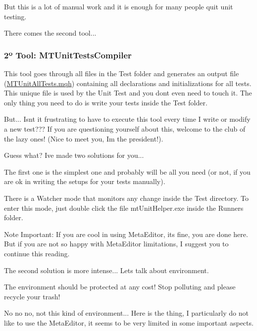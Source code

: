 But this is a lot of manual work and it is enough for many people quit unit testing.

There comes the second tool...

\subsubsection*{2º Tool\+: M\+T\+Unit\+Tests\+Compiler}

This tool goes through all files in the Test folder and generates an output file (\mbox{\hyperlink{_m_t_unit_all_tests_8mqh}{M\+T\+Unit\+All\+Tests.\+mqh}}) containing all declarations and initializations for all tests. This unique file is used by the Unit Test and you don\textquotesingle{}t even need to touch it. The only thing you need to do is write your tests inside the Test folder.

But... Isn\textquotesingle{}t it frustrating to have to execute this tool every time I write or modify a new test??? If you are questioning yourself about this, welcome to the club of the lazy ones! (Nice to meet you, I\textquotesingle{}m the president!).

Guess what? I\textquotesingle{}ve made two solutions for you...

The first one is the simplest one and probably will be all you need (or not, if you are ok in writing the setups for your tests manually).


\begin{DoxyItemize}
\item There is a Watcher mode that monitors any change inside the Test directory. To enter this mode, just double click the file mt\+Unit\+Helper.\+exe inside the Runners folder.
\end{DoxyItemize}

\begin{DoxyNote}{Note}
Important\+: If you are cool in using Meta\+Editor, it\textquotesingle{}s fine, you are done here. But if you are not so happy with Meta\+Editor limitations, I suggest you to continue this reading.
\end{DoxyNote}
The second solution is more intense... Let\textquotesingle{}s talk about environment.


\begin{DoxyCode}
The environment should be protected at any cost! Stop polluting and please recycle your trash!
\end{DoxyCode}
 No no no, not this kind of environment... Here is the thing, I particularly do not like to use the Meta\+Editor, it seems to be very limited in some important aspects.

